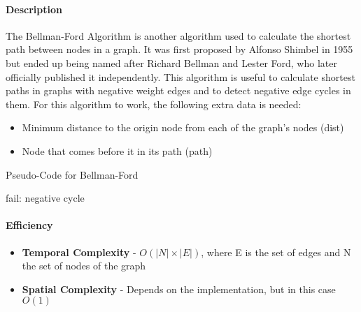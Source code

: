 \paragraph{Description}
The Bellman-Ford Algorithm is another algorithm used to calculate the shortest path between nodes in a graph. It was first proposed by Alfonso Shimbel in 1955 but ended up being named after Richard Bellman and Lester Ford, who later officially published it independently. This algorithm is useful to calculate shortest paths in graphs with negative weight edges and to detect negative edge cycles in them.
For this algorithm to work, the following extra data is needed:
\begin{itemize}
    \item Minimum distance to the origin node from each of the graph's nodes (dist)
    \item Node that comes before it in its path (path)
\end{itemize}
\begin{algorithm}[H]
    \caption{Pseudo-Code for Bellman-Ford}
    \begin{algorithmic}[1]
            \ENDFOR
                    \ENDIF
                \ENDFOR
            \ENDFOR
                    \PRINT fail: negative cycle
                \ENDIF
            \ENDFOR
        \EndFunction
    \end{algorithmic}
\end{algorithm}
\paragraph{Efficiency}
\begin{itemize}
    \item \textbf{Temporal Complexity} - $ O(|N| \times |E|) $, where E is the set of edges and N the set of nodes of the graph
    \item \textbf{Spatial Complexity} - Depends on the implementation, but in this case $ O(1) $
\end{itemize}
